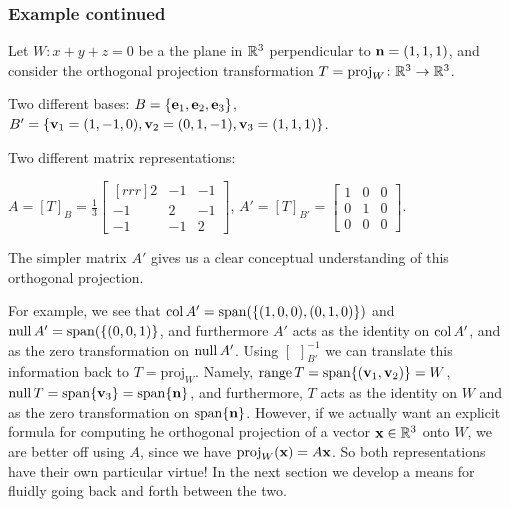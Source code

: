 \begin{frame}\frametitle{Example continued} 

{\scriptsize Let $W\colon x+y+z=0$ be a the plane in ${\mathbb R}^3$ perpendicular to ${\mathbf n}=(1,1,1)$, and consider the orthogonal projection transformation $T=\text{proj}_W\colon {\mathbb R}^3\rightarrow {\mathbb R}^3$. 

Two different bases: 
$B=\{{\mathbf e}_1,{\mathbf e}_2,{\mathbf e}_3\}$,$B'=\{{\mathbf v}_1=(1,-1,0),{\mathbf v}_2=(0,1,-1), {\mathbf v}_3=(1,1,1)\}$.

Two different matrix representations: 

$A=[T]_B=\frac{1}{3}\begin{bmatrix}[rrr]2 &-1&-1\\-1&2&-1\\ -1&-1&2
\end{bmatrix}$, 
$A'=[T]_{B'}=\begin{bmatrix}
1&0&0\\
0&1&0\\
0&0&0
\end{bmatrix}$.}
\bpause
The simpler matrix $A'$ gives us a clear \alert{conceptual} understanding of this orthogonal projection. 

\pause For example, we see that $\operatorname{col} A'=\operatorname{span}(\{(1,0,0),(0,1,0)\})$ and $\operatorname{null} A'=\operatorname{span}(\{(0,0,1)\}$, and furthermore $A'$ acts as the identity on $\operatorname{col} A'$, and as the zero transformation on $\operatorname{null} A'$. 
\bpause Using $[\hspace{5pt}]_{B'}^{-1}$ we can translate this information back to $T=\text{proj}_W$. Namely, $\operatorname{range} T=\operatorname{span}\{({\mathbf v}_1,{\mathbf v}_2)\}=W$, $\operatorname{null} T=\operatorname{span} \{{\mathbf v}_3\}=\operatorname{span} \{{\mathbf n}\}$, and furthermore, $T$ acts as the identity on $W$ and as the zero transformation on $\operatorname{span}\{{\mathbf n}\}$.  
\bpause
However, if we actually want an \alert{explicit formula} for computing he orthogonal projection of a vector ${\mathbf x}\in {\mathbb R}^3$ onto $W$, we are better off using $A$, since we have $\mbox{proj}_{W}({{\mathbf x}})=A{\mathbf x}$.  
\bpause
So both representations have their own particular virtue! In the next section we develop a means for fluidly going back and forth between the two.
\end{frame}
